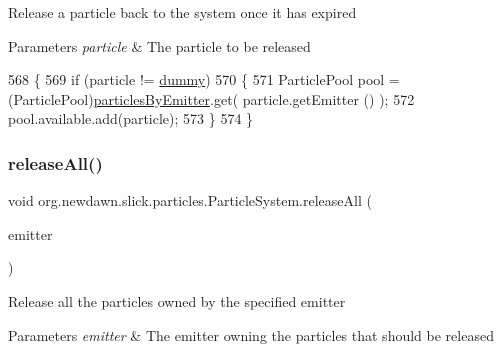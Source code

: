 Release a particle back to the system once it has expired


\begin{DoxyParams}{Parameters}
{\em particle} & The particle to be released \\
\hline
\end{DoxyParams}

\begin{DoxyCode}
568                                            \{
569         \textcolor{keywordflow}{if} (particle != \mbox{\hyperlink{classorg_1_1newdawn_1_1slick_1_1particles_1_1_particle_system_aa0d598380df6fa8819ea082fef03f3aa}{dummy}})
570         \{
571             ParticlePool pool = (ParticlePool)\mbox{\hyperlink{classorg_1_1newdawn_1_1slick_1_1particles_1_1_particle_system_aec10bb63c0065ee17c8d8133936f5db6}{particlesByEmitter}}.get( particle.getEmitter
      () );
572             pool.available.add(particle);
573         \}
574     \}
\end{DoxyCode}
\mbox{\label{classorg_1_1newdawn_1_1slick_1_1particles_1_1_particle_system_acd6d8aa56a1cf23dea44d8035a7966ee}} 
\subsubsection{\texorpdfstring{release\+All()}{releaseAll()}}
{\footnotesize\ttfamily void org.\+newdawn.\+slick.\+particles.\+Particle\+System.\+release\+All (\begin{DoxyParamCaption}\item[{\mbox{\hyperlink{interfaceorg_1_1newdawn_1_1slick_1_1particles_1_1_particle_emitter}{Particle\+Emitter}}}]{emitter }\end{DoxyParamCaption})\hspace{0.3cm}{\ttfamily [inline]}}

Release all the particles owned by the specified emitter


\begin{DoxyParams}{Parameters}
{\em emitter} & The emitter owning the particles that should be released \\
\hline
\end{DoxyParams}

